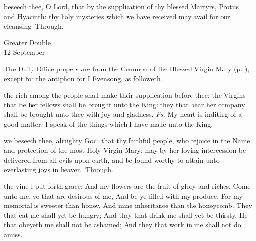 \postcommunion
{} beseech thee, O Lord, that by the supplication of thy blessed Martyrs, Protus and Hyacinth: thy holy mysteries which we have received may avail for our cleansing. Through.

\begin{inhead}
	{Greater Double\\
		12 September}
\end{inhead}

\begin{rubric}
	The Daily Office propers are from the Common of the Blessed Virgin Mary (p. \pageref{CommonBVM}), except for the antiphon for I Evensong, as followeth.
\end{rubric}

\par\noindent

\introit
{} the rich among the people shall make their supplication before thee: the Virgins that be her fellows shall be brought unto the King: they that bear her company shall be brought unto thee with joy and gladness. \textit{Ps.} My heart is inditing of a good matter: I speak of the things which I have made unto the King.

\collect
{} we beseech thee, almighty God: that thy faithful people, who rejoice in the Name and protection of the most Holy Virgin Mary; may by her loving intercession be delivered from all evils upon earth, and be found worthy to attain unto everlasting joys in heaven. Through.

 the vine I put forth grace; And my flowers are the fruit of glory and riches. Come unto me, ye that are desirous of me, And be ye filled with my produce. For my memorial is sweeter than honey, And mine inheritance than the honeycomb. They that eat me shall yet be hungry; And they that drink me shall yet be thirsty. He that obeyeth me shall not be ashamed; And they that work in me shall not do amiss.

